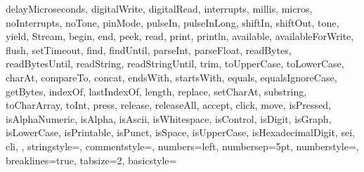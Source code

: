 {{                delayMicroseconds, digitalWrite, digitalRead, interrupts, millis, 
                micros, noInterrupts, noTone, pinMode, pulseIn, pulseInLong, shiftIn, 
                shiftOut, tone, yield, Stream, begin, end, peek, read, print, 
                println, available, availableForWrite, flush, setTimeout, find, 
                findUntil, parseInt, parseFloat, readBytes, readBytesUntil, readString, 
                readStringUntil, trim, toUpperCase, toLowerCase, charAt, compareTo, 
                concat, endsWith, startsWith, equals, equalsIgnoreCase, getBytes, 
                indexOf, lastIndexOf, length, replace, setCharAt, substring, 
                toCharArray, toInt, press, release, releaseAll, accept, click, move, 
                isPressed, isAlphaNumeric, isAlpha, isAscii, isWhitespace, isControl, 
                isDigit, isGraph, isLowerCase, isPrintable, isPunct, isSpace, 
                isUpperCase, isHexadecimalDigit, sei, cli,
                },      
%
%
  stringstyle=\color{arduinoDarkBlue},    
  commentstyle=\color{arduinoGrey},    
%          
%   
  numbers=left,                    
  numbersep=5pt,                   
  numberstyle=\color{arduinoGrey},    
%
%
  breaklines=true,                    %
  tabsize=2,         
  basicstyle=\ttfamily  
}